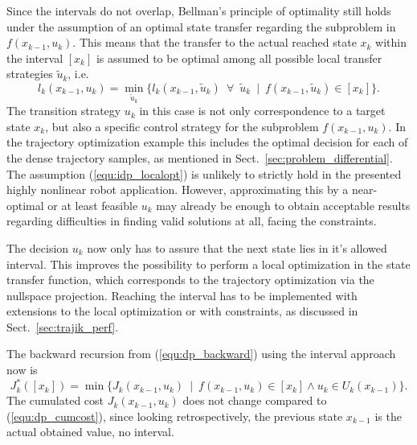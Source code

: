 \documentclass[runningheads]{llncs}
\begin{document}
Since the intervals do not overlap, Bellman's principle of optimality still holds under the assumption of an optimal state transfer regarding the subproblem in $f(x_{k-1},u_k)$.
This means that the transfer to the actual reached state $x_k$ within the interval $[x_k]$ is assumed to be optimal among all possible local transfer strategies $\tilde{u}_k$, i.e.
\begin{equation}
l_k(x_{k-1},u_k) = \min_{\tilde{u}_k}{\{
l_k(x_{k-1},\tilde{u}_k)
\enspace \forall \enspace
\tilde{u}_k
\enspace |  \enspace
f(x_{k-1},\tilde{u}_k) \in [x_k]
\}}.
\label{equ:idp_localopt}
\end{equation}
The transition strategy $u_k$ in this case is not only correspondence to a target state $x_k$, but also a specific control strategy for the subproblem $f(x_{k-1},u_k)$. 
In the trajectory optimization example this includes the optimal decision for each of the dense trajectory samples, as mentioned in Sect.~\ref{sec:problem_differential}.
The assumption (\ref{equ:idp_localopt}) is unlikely to strictly hold in the presented highly nonlinear robot application.
However, approximating this by a near-optimal or at least feasible $u_k$ may already be enough to obtain acceptable results regarding difficulties in finding valid solutions at all, facing the constraints. 

The decision $u_k$ now only has to assure that the next state lies in it's allowed interval.
This improves the possibility to perform a local optimization in the state transfer function, which corresponds to the trajectory optimization via the nullspace projection.
Reaching the interval has to be implemented with extensions to the local optimization or with constraints, as discussed in Sect.~\ref{sec:trajik_perf}.

The backward recursion from (\ref{equ:dp_backward}) using the interval approach now is
\begin{equation}
J^*_{k}([x_k]) = \min{\{J_k(x_{k-1},u_k) 
\enspace | \enspace 
f(x_{k-1},u_k) \in [x_k] \land u_k \in U_k(x_{k-1})  \}}.
\label{equ:idp_backward}
\end{equation}
%
The cumulated cost $J_k(x_{k-1},u_k) $ does not change compared to (\ref{equ:dp_cumcost}), since looking retrospectively, the previous state $x_{k-1}$ is the actual obtained value, no interval.
\end{document}
